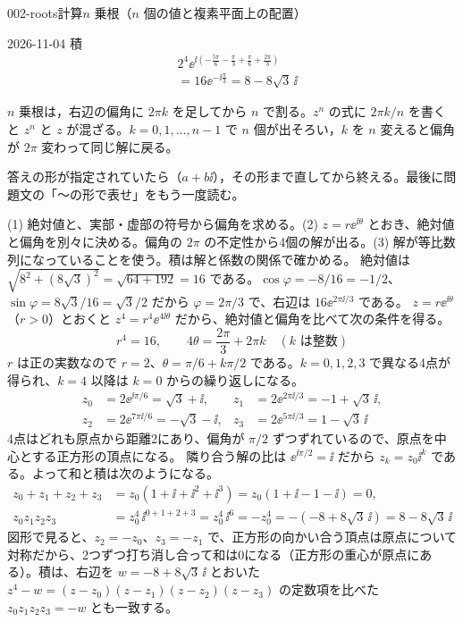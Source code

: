 \documentclass[uplatex,dvipdfmx,a4paper,11pt]{jsarticle}
\begin{document}
\begin{mondai}{002-roots}{計算}{$n$ 乗根（$n$ 個の値と複素平面上の配置）}
\begin{kotaeutsushi}{2026-11-04}
積
\begin{align*}
&2^{4}\ee^{\ii\left(-\frac{5\pi}{6}-\frac{\pi}{3}+\frac{\pi}{6}+\frac{2\pi}{3}\right)}\\
&=16\ee^{-\ii\frac{\pi}{3}}=8-8\sqrt{3}\,\ii
\end{align*}
\end{kotaeutsushi}
\begin{kizuki}
\item $n$ 乗根は，右辺の偏角に $2\pi k$ を足してから $n$ で割る。$z^{n}$ の式に $2\pi k/n$ を書くと $z^{n}$ と $z$ が混ざる。$k=0,1,\ldots,n-1$ で $n$ 個が出そろい，$k$ を $n$ 変えると偏角が $2\pi$ 変わって同じ解に戻る。
\item 答えの形が指定されていたら（$a+b\ii$），その形まで直してから終える。最後に問題文の「〜の形で表せ」をもう一度読む。
\end{kizuki}
\begin{tadashii}
\houshin (1) 絶対値と、実部・虚部の符号から偏角を求める。(2) $z=r\ee^{\ii\theta}$ とおき、絶対値と偏角を別々に決める。偏角の $2\pi$ の不定性から4個の解が出る。(3) 解が等比数列になっていることを使う。積は解と係数の関係で確かめる。
\keisan {} 絶対値は $\sqrt{8^{2}+(8\sqrt{3})^{2}}=\sqrt{64+192}=16$ である。$\cos\varphi=-8/16=-1/2$、$\sin\varphi=8\sqrt{3}/16=\sqrt{3}/2$ だから $\varphi=2\pi/3$ で、右辺は $16\ee^{2\pi\ii/3}$ である。
 $z=r\ee^{\ii\theta}$（$r>0$）とおくと $z^{4}=r^{4}\ee^{4\ii\theta}$ だから、絶対値と偏角を比べて次の条件を得る。
\[ r^{4}=16,\qquad 4\theta=\frac{2\pi}{3}+2\pi k\quad(k\text{ は整数}) \]
$r$ は正の実数なので $r=2$、$\theta=\pi/6+k\pi/2$ である。$k=0,1,2,3$ で異なる4点が得られ、$k=4$ 以降は $k=0$ からの繰り返しになる。
\begin{align*}
  z_{0}&=2\ee^{\ii\pi/6}=\sqrt{3}+\ii, & z_{1}&=2\ee^{2\pi\ii/3}=-1+\sqrt{3}\,\ii,\\
  z_{2}&=2\ee^{7\pi\ii/6}=-\sqrt{3}-\ii, & z_{3}&=2\ee^{5\pi\ii/3}=1-\sqrt{3}\,\ii
\end{align*}
4点はどれも原点から距離2にあり、偏角が $\pi/2$ ずつずれているので、原点を中心とする正方形の頂点になる。
 隣り合う解の比は $\ee^{\ii\pi/2}=\ii$ だから $z_{k}=z_{0}\ii^{k}$ である。よって和と積は次のようになる。
\begin{align*}
  z_{0}+z_{1}+z_{2}+z_{3}&=z_{0}(1+\ii+\ii^{2}+\ii^{3})=z_{0}(1+\ii-1-\ii)=0,\\
  z_{0}z_{1}z_{2}z_{3}&=z_{0}^{4}\,\ii^{0+1+2+3}=z_{0}^{4}\,\ii^{6}=-z_{0}^{4}=-(-8+8\sqrt{3}\,\ii)=8-8\sqrt{3}\,\ii
\end{align*}
図形で見ると、$z_{2}=-z_{0}$、$z_{3}=-z_{1}$ で、正方形の向かい合う頂点は原点について対称だから、2つずつ打ち消し合って和は0になる（正方形の重心が原点にある）。積は、右辺を $w=-8+8\sqrt{3}\,\ii$ とおいた $z^{4}-w=(z-z_{0})(z-z_{1})(z-z_{2})(z-z_{3})$ の定数項を比べた $z_{0}z_{1}z_{2}z_{3}=-w$ とも一致する。

\end{tadashii}
\end{mondai}
\end{document}
